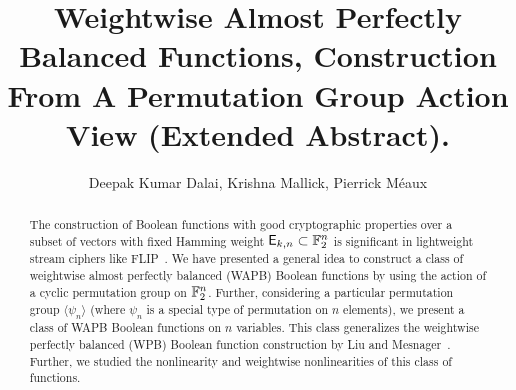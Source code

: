 \documentclass{llncs}
\begin{document}
\title{Weightwise Almost Perfectly Balanced Functions, Construction From A Permutation Group Action View (Extended Abstract).}
		

\author{
Deepak Kumar Dalai, Krishna Mallick, Pierrick M\'eaux
}

\maketitle


\setcounter{page}{1}	
\begin{abstract}
The construction of Boolean functions with good cryptographic properties over a subset of vectors with fixed Hamming weight $\mathsf{E}_{k,n} \subset \mathbb{F}_2^n$ is significant in lightweight stream ciphers like FLIP~\cite{EC:MJSC16}. 
We have presented a general idea to construct a class of weightwise almost perfectly balanced (WAPB) Boolean functions by using the action of a cyclic permutation group on $\mathbb{F}_2^n$. Further, considering a particular permutation group $\langle \psi_n \rangle$ (where $\psi_n$ is a special type of permutation on $n$ elements), we present a class of WAPB Boolean functions on $n$ variables. This class generalizes the weightwise perfectly balanced (WPB) Boolean function construction by Liu and Mesnager~\cite{DCC:LiuMes19}. Further, we studied the nonlinearity and weightwise nonlinearities of this class of functions.   
\end{abstract}
\end{document}
